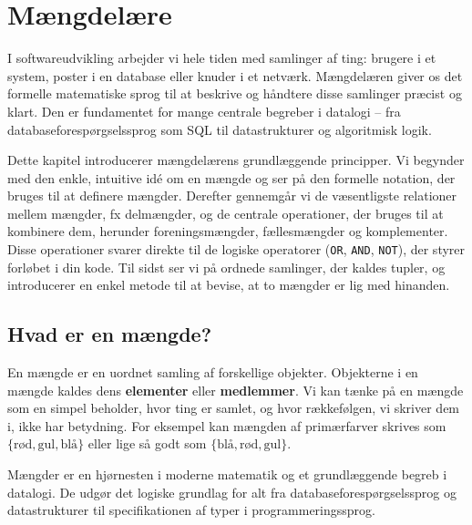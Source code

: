 \chapter{Mængdelære}
\label{chap:ch3}

I softwareudvikling arbejder vi hele tiden med samlinger af ting: brugere i et system, poster i en database eller knuder i et netværk. Mængdelæren giver os det formelle matematiske sprog til at beskrive og håndtere disse samlinger præcist og klart. Den er fundamentet for mange centrale begreber i datalogi -- fra databaseforespørgselssprog som SQL til datastrukturer og algoritmisk logik.

Dette kapitel introducerer mængdelærens grundlæggende principper. Vi begynder med den enkle, intuitive idé om en mængde og ser på den formelle notation, der bruges til at definere mængder. Derefter gennemgår vi de væsentligste relationer mellem mængder, fx delmængder, og de centrale operationer, der bruges til at kombinere dem, herunder foreningsmængder, fællesmængder og komplementer. Disse operationer svarer direkte til de logiske operatorer (\texttt{OR}, \texttt{AND}, \texttt{NOT}), der styrer forløbet i din kode. Til sidst ser vi på ordnede samlinger, der kaldes tupler, og introducerer en enkel metode til at bevise, at to mængder er lig med hinanden.

\section{Hvad er en mængde?}
En mængde er en uordnet samling af forskellige objekter. Objekterne i en mængde kaldes dens \textbf{elementer} eller \textbf{medlemmer}. Vi kan tænke på en mængde som en simpel beholder, hvor ting er samlet, og hvor rækkefølgen, vi skriver dem i, ikke har betydning. For eksempel kan mængden af primærfarver skrives som $\{ \text{rød}, \text{gul}, \text{blå} \}$ eller lige så godt som $\{ \text{blå}, \text{rød}, \text{gul} \}$.

Mængder er en hjørnesten i moderne matematik og et grundlæggende begreb i datalogi. De udgør det logiske grundlag for alt fra databaseforespørgselssprog og datastrukturer til specifikationen af typer i programmeringssprog.

